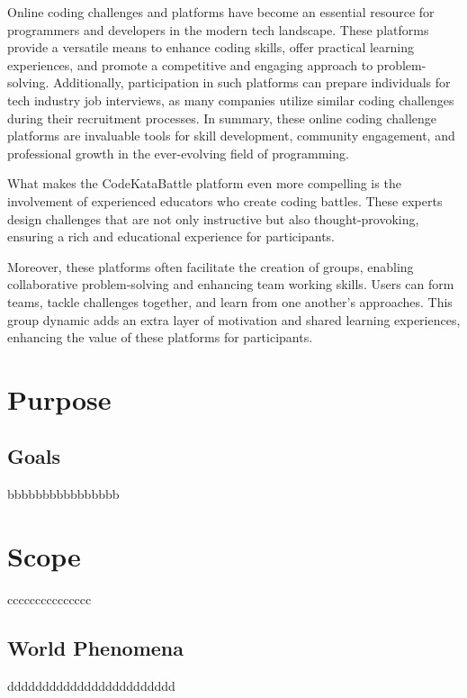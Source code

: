 Online coding challenges and platforms have become an essential resource for programmers and developers in the modern tech landscape. These platforms provide a versatile means to enhance coding skills, offer practical learning experiences, and promote a competitive and engaging approach to problem-solving. Additionally, participation in such platforms can prepare individuals for tech industry job interviews, as many companies utilize similar coding challenges during their recruitment processes. 
In summary, these online coding challenge platforms are invaluable tools for skill development, community engagement, and professional growth in the ever-evolving field of programming.

What makes the CodeKataBattle platform even more compelling is the involvement of experienced educators who create coding battles. These experts design challenges that are not only instructive but also thought-provoking, ensuring a rich and educational experience for participants.

Moreover, these platforms often facilitate the creation of groups, enabling collaborative problem-solving and enhancing team working skills. Users can form teams, tackle challenges together, and learn from one another's approaches. This group dynamic adds an extra layer of motivation and shared learning experiences, enhancing the value of these platforms for participants.

\newpage

\section{Purpose}
\label{sec:purpose}%

\subsection{Goals}
\label{subsec:goals}%
bbbbbbbbbbbbbbbb

\section{Scope}
\label{sec:scope}%
ccccccccccccccc

\subsection{World Phenomena}
\label{subsec:world_phenomena}%
dddddddddddddddddddddddd



